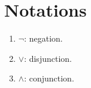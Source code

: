 \documentclass[a4paper,12pt]{article}
\begin{document}
\section*{Notations}

\begin{enumerate}
	\renewcommand{\labelenumi}{\(\diamond\)}
	\item
	      \( \neg \)\;:\;
	      negation.

	\item
	      \( \vee \)\;:\;
	      disjunction.

	\item
	      \( \wedge \)\;:\;
	      conjunction.
\end{enumerate}
\end{document}
